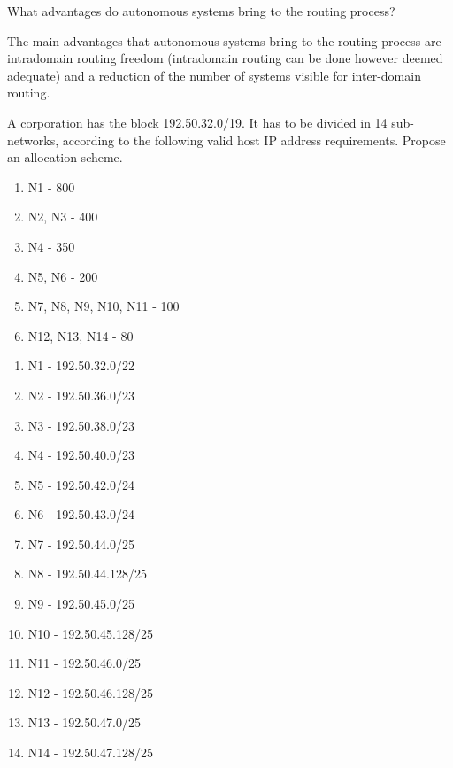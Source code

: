 \begin{Exercise}
What advantages do autonomous systems bring to the routing process?
\end{Exercise}
\begin{Answer}
The main advantages that autonomous systems bring to the routing process are intradomain routing freedom (intradomain routing can be done however deemed adequate) and a reduction of the number of systems visible for inter-domain routing.
\end{Answer}

\begin{Exercise}
A corporation has the block 192.50.32.0/19.
It has to be divided in 14 sub-networks, according to the following valid host IP address requirements.
Propose an allocation scheme.
\begin{enumerate}
\item N1 - 800
\item N2, N3 - 400
\item N4 - 350
\item N5, N6 - 200
\item N7, N8, N9, N10, N11 - 100
\item N12, N13, N14 - 80
\end{enumerate}
\end{Exercise}
\begin{Answer}
\begin{enumerate}
\item N1 - 192.50.32.0/22
\item N2 - 192.50.36.0/23
\item N3 - 192.50.38.0/23
\item N4 - 192.50.40.0/23
\item N5 - 192.50.42.0/24
\item N6 - 192.50.43.0/24
\item N7 - 192.50.44.0/25
\item N8 - 192.50.44.128/25
\item N9 - 192.50.45.0/25
\item N10 - 192.50.45.128/25
\item N11 - 192.50.46.0/25
\item N12 - 192.50.46.128/25
\item N13 - 192.50.47.0/25
\item N14 - 192.50.47.128/25
\end{enumerate}

\end{Answer}

